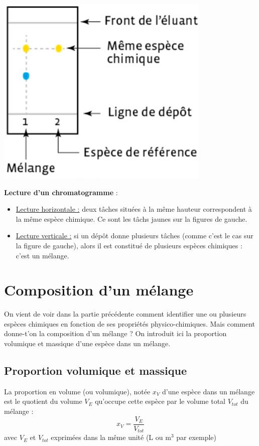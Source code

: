 \begin{minipage}[c]{0.4\textwidth}
    \includegraphics{Images/Chapitre_1/CCM.png}
\end{minipage}
\begin{minipage}[c]{0.6\textwidth}
    \textbf{Lecture d'un chromatogramme} :
    \begin{itemize}
        \item \underline{Lecture horizontale :} deux tâches situées à la même hauteur correspondent à la même espèce chimique. Ce sont les tâchs jaunes sur la figures de gauche.
        \item  \underline{Lecture verticale :} si un dépôt donne plusieurs tâches (comme c'est le cas sur la figure de gauche), alors il est constitué de plusieurs espèces chimiques : c’est un mélange.
    \end{itemize}
\end{minipage}

\section{Composition d'un mélange}
On vient de voir dans la partie précédente comment identifier une ou plusieurs espèces chimiques en fonction de ses propriétés physico-chimiques. Mais comment donne-t'on la composition d'un mélange ? On introduit ici la proportion volumique et massique d'une espèce dans un mélange.

\subsection{Proportion volumique et massique}

\begin{tcolorbox}[colback=green!5!white,colframe=green!75!black,title=\textbf{Proportion volumique}]
La proportion en volume (ou volumique), notée $x_V$ d'une espèce dans un mélange est le quotient du volume $V_{E}$ qu'occupe cette espèce par le volume total $V_{tot}$ du mélange :
\begin{equation*}
    x_V=\frac{V_E}{V_{tot}}
\end{equation*}
avec $V_{E}$ et $V_{tot}$ exprimées dans la même unité (L ou m$^3$ par exemple)
\end{tcolorbox}

